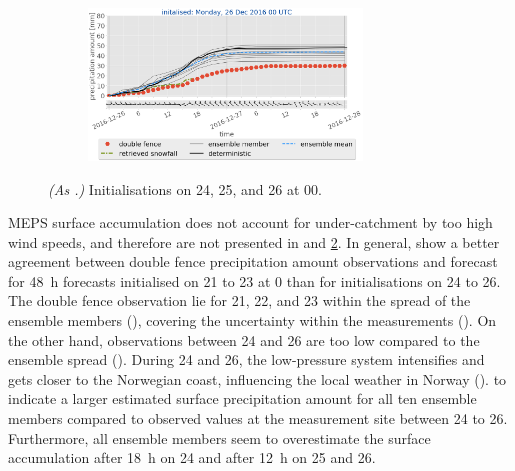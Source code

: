 \begin{figure}[H]
\begin{subfigure}[t]{0.97\textwidth}
		\caption{}\label{fig:sfc_acc26}
	\end{subfigure}
	\begin{subfigure}[t]{\textwidth}
		\centering
		\includegraphics[trim={1.2cm 0cm 1.1cm 21.4cm},clip,width=0.8\textwidth]{./fig_sfc_acc/acc_wind_20161226_00}
	\end{subfigure}
	\caption{\textit{(As .)} Initialisations on \num{24}, \num{25}, and \SI{26}{\dec} at \SI{00}{\UTC}. }\label{fig:sfc_acc:2426}
\end{figure}
\noindent
MEPS surface accumulation does not account for under-catchment by too high wind speeds, and therefore are not presented in  and \ref{fig:sfc_acc:2426}.
In general,  show a better agreement between double fence precipitation amount observations and forecast for \SI{48}{\hour} forecasts initialised on \num{21} to \SI{23}{\dec} at \SI{0}{\UTC} than for initialisations on \num{24} to \SI{26}{\dec}. 
The double fence observation lie for \num{21}, \num{22}, and \SI{23}{\dec} within the spread of the ensemble members (), covering the uncertainty within the measurements (). On the other hand, observations between \num{24} and \SI{26}{\dec} are too low  compared to the ensemble spread ().
During \num{24} and \SI{26}{\dec}, the low-pressure system intensifies and gets closer to the Norwegian coast, influencing the local weather in Norway ().  to  indicate a larger estimated surface precipitation amount for all ten ensemble members compared to observed values at the measurement site between \num{24} to \SI{26}{\dec}. Furthermore, all ensemble members seem to overestimate the surface accumulation after \SI{18}{\hour} on \SI{24}{\dec} and after \SI{12}{\hour} on \num{25} and \SI{26}{\dec}. 
